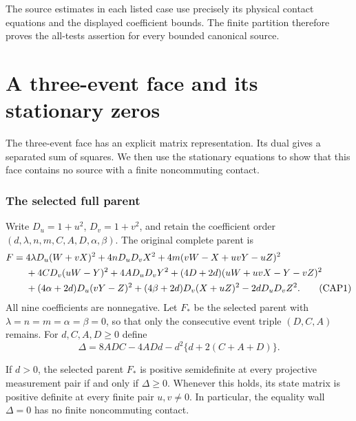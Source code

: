 The source estimates in each listed case use precisely its
physical contact equations and the displayed coefficient bounds.
The finite partition therefore proves the all-tests assertion for
every bounded canonical source.

\section{A three-event face and its stationary zeros}
\label{component:p23a094ff816d}

\label{p23a094ff816d:sec:rederived-three-event-contact}

The three-event face has an explicit matrix representation. Its
dual gives a separated sum of squares. We then use the stationary
equations to show that this face contains no source with a finite
noncommuting contact.

\subsubsection*{The selected full parent}

Write $D_u=1+u^2$, $D_v=1+v^2$, and retain the coefficient order
$(d,\lambda,n,m,C,A,D,\alpha,\beta)$.  The original complete parent is
\begin{align}
F={}&4\lambda D_u(W+vX)^2+4nD_uD_vX^2
 +4m(vW-X+uvY-uZ)^2\notag\\
&+4CD_v(uW-Y)^2+4AD_uD_vY^2
 +(4D+2d)(uW+uvX-Y-vZ)^2\notag\\
&+(4\alpha+2d)D_u(vY-Z)^2
 +(4\beta+2d)D_v(X+uZ)^2-2dD_uD_vZ^2.
\tag{CAP1}
\end{align}
All nine coefficients are nonnegative.  Let $F_*$ be the selected parent
with $\lambda=n=m=\alpha=\beta=0$, so that only the consecutive event
triple $(D,C,A)$ remains.  For $d,C,A,D\geq0$ define
\[
\Delta=8ADC-4ADd-d^2\{d+2(C+A+D)\}.
\tag{CAP2}
\]

\begin{proposition}
If $d>0$, the selected parent $F_*$ is positive semidefinite at every
projective measurement pair if and only if $\Delta\geq0$.  Whenever
this holds, its state matrix is positive definite at every finite pair
$u,v\ne0$.  In particular, the equality wall $\Delta=0$ has no finite
noncommuting contact.
\end{proposition}


